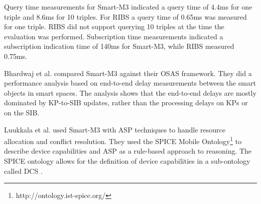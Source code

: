 Query time measurements for Smart-M3 indicated a query time of 4.4ms for one triple and 8.6ms for 10 triples. For \ac{RIBS} a query time of 0.65ms was measured for one triple. \ac{RIBS} did not support querying 10 triples at the time the evaluation was performed. Subscription time measurements indicated a subscription indication time of 140ms for Smart-M3, while \ac{RIBS} measured 0.75ms.

Bhardwaj et al. \cite{Bhardwaj2011} compared Smart-M3 against their \ac{OSAS} framework. They did a performance analysis based on end-to-end delay measurements between the smart objects in smart spaces. The analysis shows that the end-to-end delays are mostly dominated by KP-to-SIB updates, rather than the processing delays on \acp{KP} or on the \ac{SIB}.



Luukkala et al. \cite{Luukkala2010} used Smart-M3 with \ac{ASP} techniques to handle resource allocation and conflict resolution. They used the \ac{SPICE} Mobile Ontology\footnote{http://ontology.ist-spice.org/} to describe device capabilities and \ac{ASP} as a rule-based approach to reasoning. The \ac{SPICE} ontology allows for the definition of device capabilities in a sub-ontology called \ac{DCS} \cite{Villalonga2009}.


